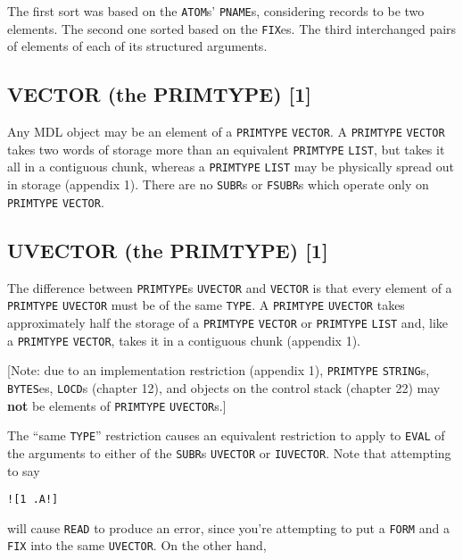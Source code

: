 \documentclass[a4paper]{scrbook}
\begin{document}
The first sort was based on the \texttt{ATOM}s' \texttt{PNAME}s, considering records to be two elements. The second one
sorted based on the \texttt{FIX}es. The third interchanged pairs of elements of each of its structured arguments.

\subsection{VECTOR (the PRIMTYPE) {[}1{]}}\label{vector-the-primtype-1}

Any MDL object may be an element of a \texttt{PRIMTYPE} \texttt{VECTOR}. A \texttt{PRIMTYPE} \texttt{VECTOR} takes two
words of storage more than an equivalent \texttt{PRIMTYPE} \texttt{LIST}, but takes it all in a contiguous chunk, whereas a
\texttt{PRIMTYPE} \texttt{LIST} may be physically spread out in storage (appendix 1). There are no \texttt{SUBR}s or
\texttt{FSUBR}s which operate only on \texttt{PRIMTYPE} \texttt{VECTOR}.

\subsection{UVECTOR (the PRIMTYPE) {[}1{]}}\label{uvector-the-primtype-1}

 The difference between \texttt{PRIMTYPE}s \texttt{UVECTOR} and
\texttt{VECTOR} is that every element of a \texttt{PRIMTYPE} \texttt{UVECTOR} must be of the
same \texttt{TYPE}. A \texttt{PRIMTYPE} \texttt{UVECTOR} takes approximately half the storage of a \texttt{PRIMTYPE}
\texttt{VECTOR} or \texttt{PRIMTYPE} \texttt{LIST} and, like a \texttt{PRIMTYPE} \texttt{VECTOR}, takes it in a contiguous
chunk (appendix 1).

{[}Note: due to an implementation restriction (appendix 1), \texttt{PRIMTYPE} \texttt{STRING}s, \texttt{BYTES}es,
\texttt{LOCD}s (chapter 12), and objects on the control stack (chapter 22) may \textbf{not} be elements of
\texttt{PRIMTYPE} \texttt{UVECTOR}s.{]}

The ``same \texttt{TYPE}'' restriction causes an equivalent restriction to apply to \texttt{EVAL} of the arguments to
either of the \texttt{SUBR}s \texttt{UVECTOR} or \texttt{IUVECTOR}. Note that attempting to say

\begin{verbatim}
![1 .A!]
\end{verbatim}

will cause \texttt{READ} to produce an error, since you're attempting to put a \texttt{FORM} and a \texttt{FIX} into the
same \texttt{UVECTOR}. On the other hand,
\end{document}
